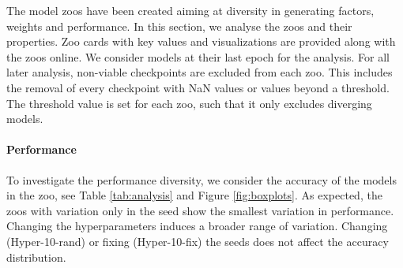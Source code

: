 The model zoos have been created aiming at diversity in generating factors, weights and performance. In this section, we analyse the zoos and their properties. Zoo cards with key values and visualizations are provided along with the zoos online. We consider models at their last epoch for the analysis.
% 
For all later analysis, non-viable checkpoints are excluded from each zoo. This includes the removal of every checkpoint with NaN values or values beyond a threshold. The threshold value is set for each zoo, such that it only excludes diverging models.




\paragraph{Performance}
To investigate the performance diversity, we consider the accuracy of the models in the zoo, see Table \ref{tab:analysis} and Figure \ref{fig:boxplots}.
As expected, the zoos with variation only in the seed show the smallest variation in performance. Changing the hyperparameters induces a broader range of variation. Changing (Hyper-10-rand) or fixing  (Hyper-10-fix) the seeds does not affect the accuracy distribution.

